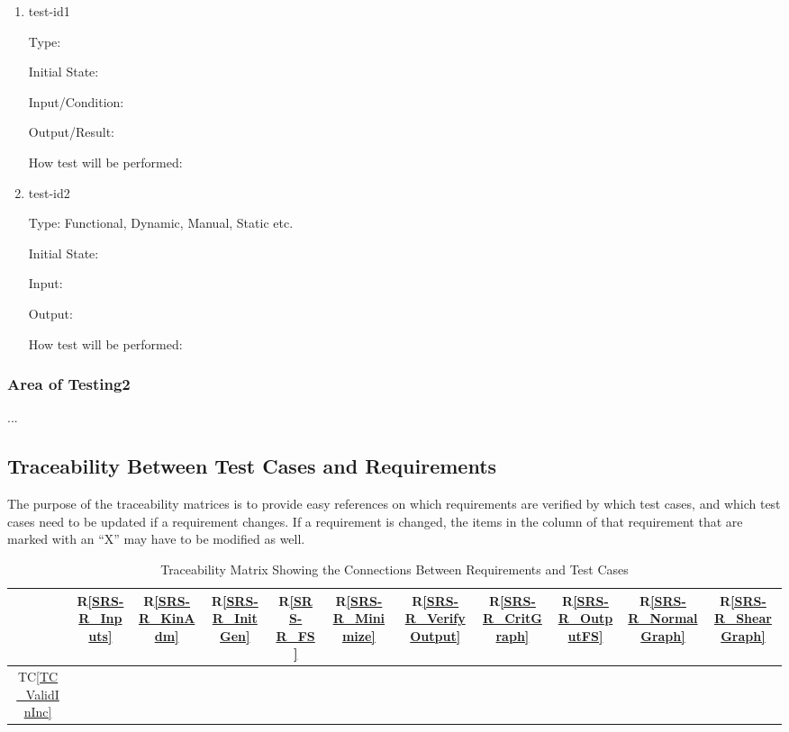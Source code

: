 \documentclass[12pt, titlepage]{article}
\newcommand{\rref}[1]{R\ref{#1}}
\newcommand{\tcref}[1]{TC\ref{#1}}
\begin{document}
\begin{enumerate}

\item{test-id1\\}

Type: 
					
Initial State: 
					
Input/Condition: 
					
Output/Result: 
					
How test will be performed: 
					
\item{test-id2\\}

Type: Functional, Dynamic, Manual, Static etc.
					
Initial State: 
					
Input: 
					
Output: 
					
How test will be performed: 

\end{enumerate}

\subsubsection{Area of Testing2}

...

\subsection{Traceability Between Test Cases and Requirements}

\noindent The purpose of the traceability matrices is to provide easy 
references on which requirements are verified by which test cases, and which 
test cases need to be updated if a requirement changes.  If a requirement is 
changed, the items in the column of that requirement that are marked
with an ``X'' may have to be modified as well. 

\begin{table}[h!]
	\centering
	\begin{tabular}{|c|c|c|c|c|c|c|c|c|c|c|}
		\hline
		& \rref{SRS-R_Inputs}& \rref{SRS-R_KinAdm}& \rref{SRS-R_InitGen}& 
		\rref{SRS-R_FS}& \rref{SRS-R_Minimize} & \rref{SRS-R_VerifyOutput}& 
		\rref{SRS-R_CritGraph}& \rref{SRS-R_OutputFS}& 
		\rref{SRS-R_NormalGraph}& \rref{SRS-R_ShearGraph} \\
		\hline
		\tcref{TC_ValidInInc}       & & & & & & & & & & \\ \hline
		\hline
	\end{tabular}
	\caption{Traceability Matrix Showing the Connections Between Requirements 
	and Test Cases}
	\label{Table:T_trace}
\end{table}
\end{document}
